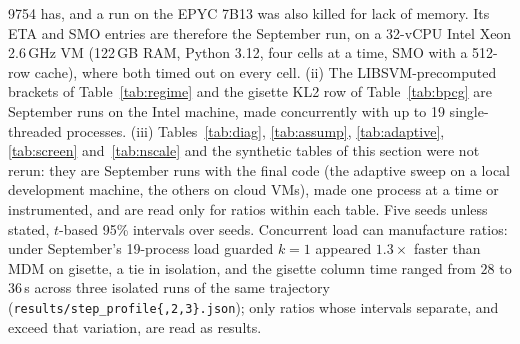 \documentclass[pdflatex,sn-apa]{sn-jnl}%
\theoremstyle{thmstyleone}
\theoremstyle{thmstyletwo}
\begin{document}
9754 has, and a run on the EPYC 7B13 was also killed for lack of memory.
Its ETA and SMO entries are therefore the September run, on a 32-vCPU
Intel Xeon 2.6\,GHz VM (122\,GB RAM, Python 3.12, four cells at a time,
SMO with a 512-row cache), where both timed out on every cell. (ii) The
LIBSVM-precomputed brackets of Table~\ref{tab:regime} and the gisette
KL2 row of Table~\ref{tab:bpcg} are September runs on the Intel machine,
made concurrently with up to 19 single-threaded processes. (iii)
Tables~\ref{tab:diag}, \ref{tab:assump}, \ref{tab:adaptive},
\ref{tab:screen} and~\ref{tab:nscale} and the synthetic tables of this
section were not rerun: they are September runs with the final code
(the adaptive sweep on a local development machine, the others on cloud
VMs), made one process at a time or instrumented, and are read only for
ratios within each table. Five seeds unless stated, $t$-based 95\%
intervals over seeds. Concurrent load can manufacture ratios: under
September's 19-process load guarded $k{=}1$ appeared $1.3\times$ faster
than MDM on gisette, a tie in isolation, and the gisette column time
ranged from $28$ to $36$\,s across three isolated runs of the same
trajectory
(\texttt{results/step\_profile\{,2,3\}.json}); only ratios whose
intervals separate, and exceed that variation, are read as results.
\end{document}
